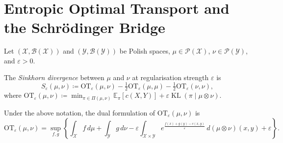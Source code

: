 
\section{Entropic Optimal Transport and the Schrödinger Bridge}

Let $(\mathcal{X}, \mathcal{B}(\mathcal{X}))$ and $(\mathcal{Y}, \mathcal{B}(\mathcal{Y}))$
be Polish spaces, $\mu \in \mathcal{P}(\mathcal{X})$, $\nu \in \mathcal{P}(\mathcal{Y})$,
and $\varepsilon > 0$.

\begin{definition}
  \label{def:sinkhorn_div}
  The \emph{Sinkhorn divergence} between $\mu$ and $\nu$ at regularisation
  strength $\varepsilon$ is
  \[
    S_\varepsilon(\mu, \nu)
    \coloneqq \mathrm{OT}_\varepsilon(\mu, \nu)
      - \tfrac{1}{2}\mathrm{OT}_\varepsilon(\mu, \mu)
      - \tfrac{1}{2}\mathrm{OT}_\varepsilon(\nu, \nu),
  \]
  where $\mathrm{OT}_\varepsilon(\mu, \nu) \coloneqq
  \min_{\pi \in \Pi(\mu,\nu)} \mathbb{E}_\pi[c(X,Y)] + \varepsilon \operatorname{KL}(\pi \mid \mu \otimes \nu)$.
\end{definition}

\begin{theorem}
  \label{thm:dual_sinkhorn}
  Under the above notation, the dual formulation of $\mathrm{OT}_\varepsilon(\mu, \nu)$ is
  \[
    \mathrm{OT}_\varepsilon(\mu, \nu)
    = \sup_{f, g} \left\{
      \int_\mathcal{X} f \, d\mu + \int_\mathcal{Y} g \, d\nu
      - \varepsilon \int_{\mathcal{X} \times \mathcal{Y}}
        e^{\frac{f(x) + g(y) - c(x,y)}{\varepsilon}} \, d(\mu \otimes \nu)(x,y)
      + \varepsilon
    \right\}.
  \]
\end{theorem}

